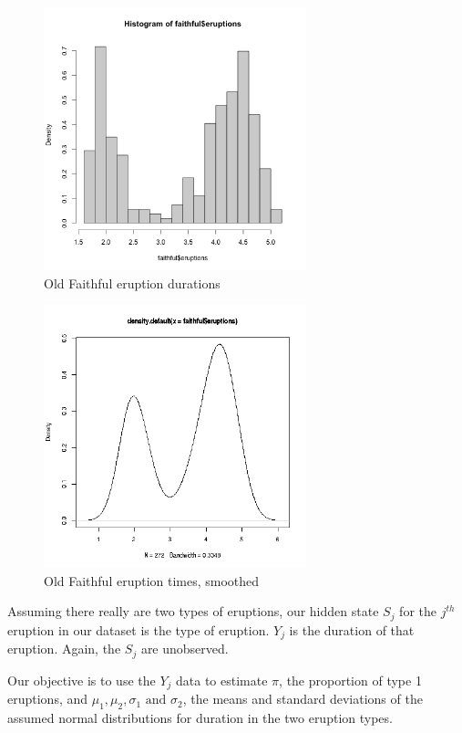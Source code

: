 \documentclass[11pt]{article}
\begin{document}
\begin{figure}[tb]
\centerline{
\includegraphics[width=3.0in]{FaithfulDuration.png}
}
\caption{Old Faithful eruption durations}
\label{faithfulhist}
\end{figure}

\begin{figure}[tb]
\centerline{
\includegraphics[width=3.0in]{FaithfulDurationSmooth.png}
}
\caption{Old Faithful eruption times, smoothed}
\label{faithfulhistsmooth}
\end{figure}

Assuming there really are two types of eruptions, our hidden state $S_j$
for the $j^{th}$ eruption in our dataset is the type of eruption.  $Y_j$
is the duration of that eruption.  Again, the $S_j$ are unobserved.

Our objective is to use the $Y_j$ data to estimate $\pi$, the proportion
of type 1 eruptions, and
$
\mu_1,
\mu_2,
\sigma_1 
\textrm{ and }
\sigma_2 
$, the means and standard deviations of the assumed normal distributions
for duration in the two eruption types.
\end{document}
